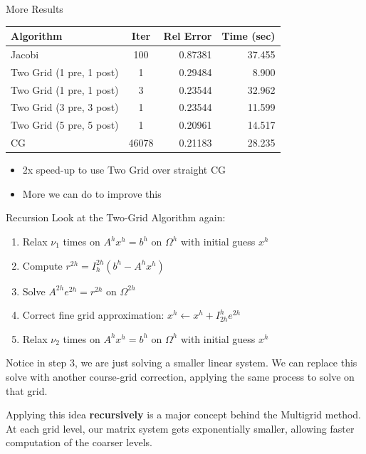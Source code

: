 \documentclass[11pt]{beamer}
\begin{document}
\begin{frame}{More Results}
  \begin{tabular}{lcrr}
    Algorithm & Iter & Rel Error & Time (sec) \\
    \hline
    Jacobi                   & 100   &  0.87381  & 37.455 \\
    Two Grid (1 pre, 1 post) & 1	   &  0.29484  &  8.900 \\
    Two Grid (1 pre, 1 post) & 3	   &  0.23544  & 32.962 \\
    Two Grid (3 pre, 3 post) & 1	   &  0.23544  & 11.599 \\
    Two Grid (5 pre, 5 post) & 1     &  0.20961  & 14.517 \\
    CG                       & 46078 &  0.21183  & 28.235
  \end{tabular}
  \begin{itemize}
  \item 2x speed-up to use Two Grid over straight CG
  \item More we can do to improve this
  \end{itemize}
\end{frame}
\begin{frame}{Recursion}
  Look at the Two-Grid Algorithm again:
  \begin{enumerate}
  \item Relax \(\nu_1\) times on \(A^h x^h = b^h\) on \(\Omega^h\) with initial guess
    \(x^h\)
  \item Compute \(r^{2h} = I_h^{2h}(b^h - A^h x^h)\)
  \item Solve \(A^{2h} e^{2h} = r^{2h}\) on \(\Omega^{2h}\)
  \item Correct fine grid approximation: \(x^h \leftarrow x^h + I_{2h}^h e^{2h}\)
  \item Relax \(\nu_2\) times on \(A^h x^h = b^h\) on \(\Omega^h\) with initial guess
    \(x^h\)
  \end{enumerate}
  Notice in step 3, we are just solving a smaller linear system.
  We can replace this solve with another course-grid correction, applying the
  same process to solve on that grid.

  Applying this idea \textbf{recursively} is a major concept behind the Multigrid
  method.  At each grid level, our matrix system gets exponentially smaller,
  allowing faster computation of the coarser levels.
\end{frame}
\end{document}
